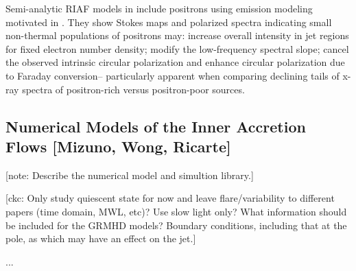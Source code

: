 \documentclass[twocolumn,tighten,dvipsnames]{aastex63}
\newcommand\note[1]{{\color{OliveGreen}[note: #1]}}
\newcommand\ckc[1]{{\color{MidnightBlue}[ckc: #1]}}
\begin{document}
Semi-analytic RIAF models in \cite{Emami2021} include positrons using emission modeling motivated in \cite{Anantua:2019bna}. They show Stokes maps and polarized spectra indicating small non-thermal populations of positrons may: increase overall intensity in jet regions for fixed electron number density; modify the low-frequency spectral slope; cancel the observed intrinsic circular polarization and enhance circular polarization due to Faraday conversion-- particularly apparent when comparing declining tails of x-ray spectra of positron-rich versus positron-poor sources.

\subsection{Numerical Models of the Inner Accretion Flows
  [Mizuno, Wong, Ricarte]}
\label{sec:numodels}

\note{Describe the numerical model and simultion library.}

\ckc{Only study quiescent state for now and leave flare/variability to
  different papers (time domain, MWL, etc)?
  Use slow light only?
  What information should be included for the GRMHD models?
  Boundary conditions, including that at the pole, as which may have
  an effect on the jet.}


...


\end{document}
